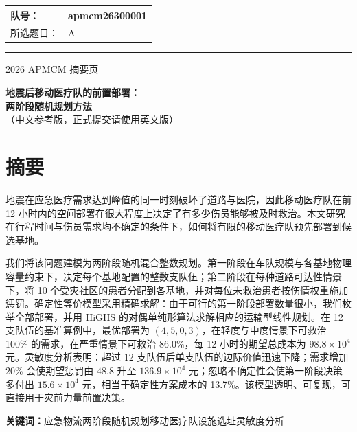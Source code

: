 \documentclass[12pt,a4paper,fontset=windows]{ctexart}
\begin{document}

\thispagestyle{fancy}

\begin{center}
\begin{tabular}{|l|l|}
\hline
队号：& apmcm26300001 \\
\hline
所选题目：& A \\
\hline
\end{tabular}
\end{center}

\vspace{2pt}
\noindent\rule{\textwidth}{2pt}
\begin{center}
2026 APMCM 摘要页
\end{center}

\begin{center}
{\bfseries 地震后移动医疗队的前置部署：\\[3pt] 两阶段随机规划方法}\\[4pt]
{\small （中文参考版，正式提交请使用英文版）}
\end{center}

\section*{摘\quad 要}

地震在应急医疗需求达到峰值的同一时刻破坏了道路与医院，因此移动医疗队在前 12 小时内的空间部署在很大程度上决定了有多少伤员能够被及时救治。本文研究在行程时间与伤员需求均不确定的条件下，如何将有限的移动医疗队预先部署到候选基地。

我们将该问题建模为两阶段随机混合整数规划。第一阶段在车队规模与各基地物理容量约束下，决定每个基地配置的整数支队伍；第二阶段在每种道路可达性情景下，将 10 个受灾社区的患者分配到各基地，并对每位未救治患者按伤情权重施加惩罚。确定性等价模型采用精确求解：由于可行的第一阶段部署数量很小，我们枚举全部部署，并用 HiGHS 的对偶单纯形算法求解相应的运输型线性规划。在 12 支队伍的基准算例中，最优部署为 $(4,5,0,3)$，在轻度与中度情景下可救治 100\% 的需求，在严重情景下可救治 86.0\%，每 12 小时的期望总成本为 $98.8\times10^{4}$ 元。灵敏度分析表明：超过 12 支队伍后单支队伍的边际价值迅速下降；需求增加 20\% 会使期望惩罚由 $48.8$ 升至 $136.9\times10^{4}$ 元；忽略不确定性会使第一阶段决策多付出 $15.6\times10^{4}$ 元，相当于确定性方案成本的 13.7\%。该模型透明、可复现，可直接用于灾前力量前置决策。

\vspace{0.5em}
\noindent\textbf{关键词：}\quad 应急物流\quad 两阶段随机规划\quad 移动医疗队\quad 设施选址\quad 灵敏度分析
\end{document}
